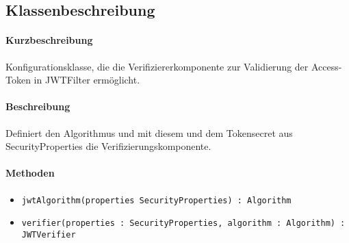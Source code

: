\subsection*{Klassenbeschreibung}%
\paragraph*{Kurzbeschreibung}
Konfigurationsklasse, die die Verifiziererkomponente zur Validierung der Access-Token in JWTFilter ermöglicht.
\paragraph*{Beschreibung}
Definiert den Algorithmus und mit diesem und dem Tokensecret aus \dq SecurityProperties\dq{} die Verifizierungskomponente.
\paragraph*{Methoden}
\begin{itemize}
	\item \texttt{jwtAlgorithm(properties SecurityProperties) : Algorithm}
    \item \texttt{verifier(properties : SecurityProperties, algorithm : Algorithm) : JWTVerifier}
\end{itemize}	
